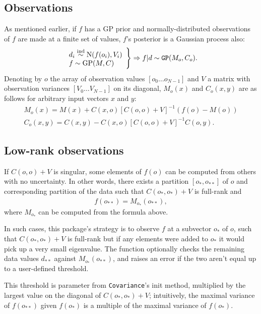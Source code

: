 \subsection{Observations}
As mentioned earlier, if $f$ has a GP prior and normally-distributed observations of $f$ are made at a finite set of values, $f$'s posterior is a Gaussian process also:
\begin{eqnarray*}
    \left.\begin{array}{l}
        d_i \stackrel{\tiny{\textup{ind}}}{\sim} \textup{N}(f(o_i), V_i)\\
        f \sim \textup{GP}(M,C)
    \end{array}\right\}\Rightarrow f|d \sim \texttt{GP}(M_o, C_o).
\end{eqnarray*}
Denoting by $o$ the array of observation values $[o_0\ldots o_{N-1}]$ and $V$ a matrix with observation variances $[V_0\ldots V_{N-1}]$ on its diagonal, $M_o(x)$ and $C_o(x,y)$ are as follows for arbitrary input vectors $x$ and $y$:
\begin{eqnarray*}
    M_o(x) = M(x) + C(x,o)[C(o,o) + V]^{-1}(f(o)-M(o))\\
    C_o(x,y) = C(x,y) - C(x,o)[C(o,o) + V]^{-1}C(o,y).
\end{eqnarray*}

\subsection{Low-rank observations}

If $C(o,o)+V$ is singular, some elements of $f(o)$ can be computed from others with no uncertainty. In other words, there exists a partition $[o_*, o_{**}]$ of $o$ and corresponding partition of the data such that $C(o_*,o_*)+V$ is full-rank and
\begin{eqnarray*}
    f(o_{**}) = M_{o_*}(o_{**}),
\end{eqnarray*}
where $M_{o_*}$ can be computed from the formula above.

In such cases, this package's strategy is to observe $f$ at a subvector $o_*$ of $o$, such that $C(o_*,o_*)+V$ is full-rank but if any elements were added to $o_*$ it would pick up a very small eigenvalue. The function  optionally checks the remaining data values $d_{**}$ against $M_{o_*}(o_{**})$, and raises an error if the two aren't equal up to a user-defined threshold.

This threshold is parameter  from \texttt{Covariance}'s init method, multiplied by the largest value on the diagonal of $C(o_*,o_*)+V$; intuitively, the maximal variance of $f(o_{**})$ given $f(o_*)$ is a multiple of the maximal variance of $f(o_*)$.

